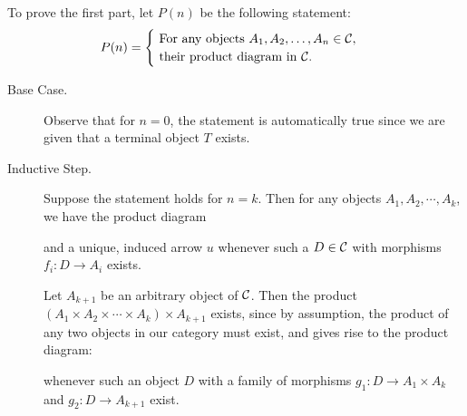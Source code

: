 \begin{prf}
    To prove the first part, let $P(n)$ be the following statement: 
    \[
        P(n) = 
        \begin{cases}
            \text{ For any objects } A_1, A_2, \dots, A_n \in \mathcal{C},\\
            \text{ their product diagram in }\mathcal{C}.
        \end{cases}
    \]
    \begin{description}
        \item[Base Case.] Observe that for $n = 0$,  the statement is
        automatically true since we are given that a terminal object
        $T$ exists. 

        \item[Inductive Step.] Suppose the statement holds for $n =
        k$. Then for any objects $A_1, A_2, \cdots, A_k$, 
        we have the product diagram
        \begin{center}
        \end{center}
        and a unique, induced arrow $u$ whenever such a $D \in \mathcal{C}$ with
        morphisms $f_i: D \to A_i$ exists.

        Let $A_{k+1}$ be an arbitrary object of $\mathcal{C}$. Then the
        product $(A_1 \times A_2 \times \cdots \times A_k)\times
        A_{k+1}$ exists, since by assumption,  
        the product of any two objects in our
        category must exist, and gives rise to the product diagram: 
        \begin{center}
        \end{center}
        whenever such an object $D$ with a family of morphisms $g_1: D
        \to A_1 \times A_k$ and  $g_2: D \to A_{k+1}$ exist.


\end{description}
\end{prf}
